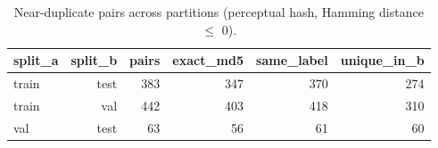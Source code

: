 \begin{table}[ht]
\centering
\small
\caption{Near-duplicate pairs across partitions (perceptual hash, Hamming distance $\leq$ 0).}
\label{tab:duplicates}
\begin{tabular}{lrrrrr}
\toprule
split\_a & split\_b & pairs & exact\_md5 & same\_label & unique\_in\_b \\
\midrule
train & test & 383 & 347 & 370 & 274 \\
train & val & 442 & 403 & 418 & 310 \\
val & test & 63 & 56 & 61 & 60 \\
\bottomrule
\end{tabular}
\end{table}